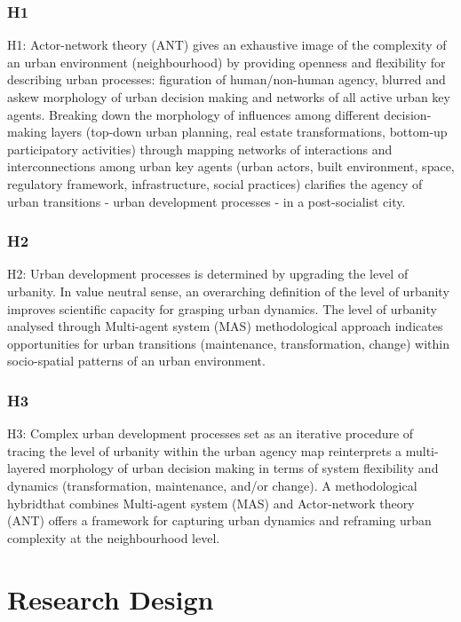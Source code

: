 \documentclass[11pt]{report}
\begin{document}
\subsubsection{H1}

H1: Actor-network theory (ANT) gives an exhaustive image of the complexity of an urban environment (neighbourhood) by providing openness and flexibility for describing urban processes: figuration of human/non-human agency, blurred and askew morphology of urban decision  making and networks of all active urban key agents.
Breaking  down  the morphology of influences among different decision-making layers (top-down urban planning, real estate transformations, bottom-up participatory activities) through mapping networks of interactions and interconnections among urban key agents (urban actors, built environment, space, regulatory framework, infrastructure, 
social practices) clarifies the agency of urban transitions - urban development processes - in a post-socialist city.

\subsubsection{H2}

H2:  Urban development processes  is  determined  by  upgrading the  level  of  urbanity.  In value neutral sense, an overarching definition of the level of urbanity improves scientific capacity for grasping urban dynamics. The level of urbanity analysed through Multi-agent system (MAS) methodological approach indicates opportunities for urban transitions (maintenance, transformation, change) within socio-spatial patterns of an urban environment. 

\subsubsection{H3}

H3: Complex urban development processes set as an iterative procedure of tracing the level of urbanity within the urban agency map reinterprets a multi-layered morphology of urban decision making in terms of system flexibility and dynamics (transformation, maintenance, and/or change). A methodological hybridthat combines Multi-agent system (MAS) and Actor-network theory (ANT) offers a framework for capturing urban dynamics and reframing urban complexity at the neighbourhood level.

\section{Research Design}
\end{document}
